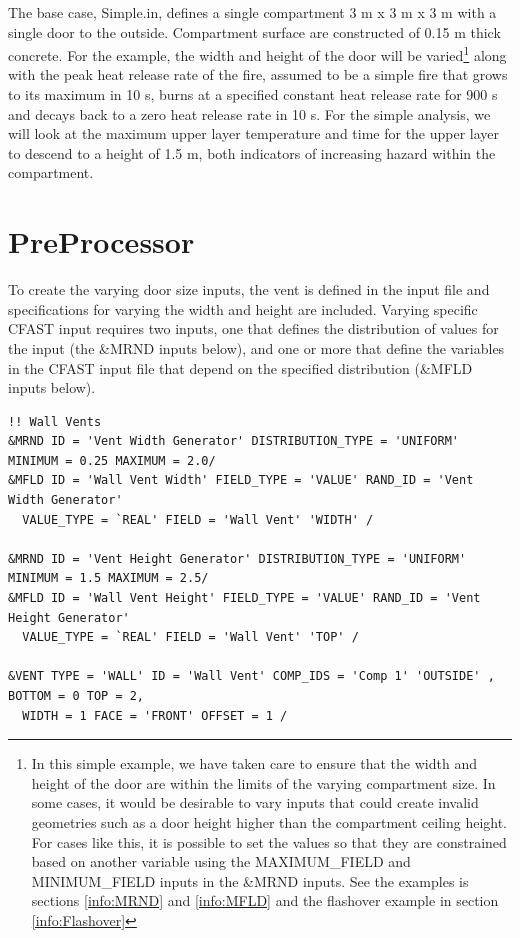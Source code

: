 \documentclass[12pt,twoside]{book}
\begin{document}
The base case, {\ct Simple.in}, defines a single compartment 3 m x 3 m x 3 m with a single door to the outside.  Compartment surface are constructed of 0.15 m thick concrete. For the example, the width and height of the door will be varied\footnote{In this simple example, we have taken care to ensure that the width and height of the door are within the limits of the varying compartment size. In some cases, it would be desirable to vary inputs that could create invalid geometries such as a door height higher than the compartment ceiling height. For cases like this, it is possible to set the values so that they are constrained based on another variable using the {\ct MAXIMUM\_FIELD} and {\ct MINIMUM\_FIELD} inputs in the \&MRND inputs. See the examples is sections \ref{info:MRND} and \ref{info:MFLD} and the flashover example in section \ref{info:Flashover}\label{footnote_limits}} along with the peak heat release rate of the fire, assumed to be a simple fire that grows to its maximum in 10 s, burns at a specified constant heat release rate for 900 s and decays back to a zero heat release rate in 10 s. For the simple analysis, we will look at the maximum upper layer temperature and time for the upper layer to descend to a height of 1.5 m, both indicators of increasing hazard within the compartment.

\section{PreProcessor}
\label{preprocessor}

To create the varying door size inputs, the vent is defined in the input file and specifications for varying the width and height are included. Varying specific CFAST input requires two inputs, one that defines the distribution of values for the input (the {\ct \&MRND} inputs below), and one or more that define the variables in the CFAST input file that depend on the specified distribution ({\ct \&MFLD} inputs below).

\begin{lstlisting}[language=cdata, basicstyle=\scriptsize]
!! Wall Vents
&MRND ID = 'Vent Width Generator' DISTRIBUTION_TYPE = 'UNIFORM' MINIMUM = 0.25 MAXIMUM = 2.0/
&MFLD ID = 'Wall Vent Width' FIELD_TYPE = 'VALUE' RAND_ID = 'Vent Width Generator'
  VALUE_TYPE = `REAL' FIELD = 'Wall Vent' 'WIDTH' /

&MRND ID = 'Vent Height Generator' DISTRIBUTION_TYPE = 'UNIFORM' MINIMUM = 1.5 MAXIMUM = 2.5/
&MFLD ID = 'Wall Vent Height' FIELD_TYPE = 'VALUE' RAND_ID = 'Vent Height Generator'
  VALUE_TYPE = `REAL' FIELD = 'Wall Vent' 'TOP' /

&VENT TYPE = 'WALL' ID = 'Wall Vent' COMP_IDS = 'Comp 1' 'OUTSIDE' , BOTTOM = 0 TOP = 2,
  WIDTH = 1 FACE = 'FRONT' OFFSET = 1 /
\end{lstlisting}
\end{document}
